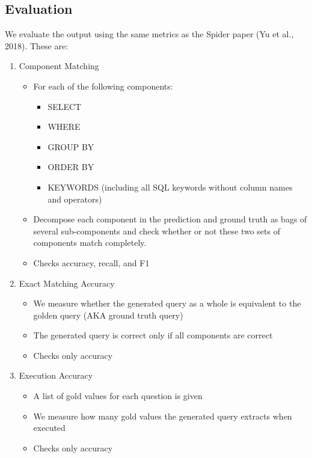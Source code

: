 \subsection{Evaluation}
\label{sec:evaluation-metrics}

We evaluate the output using the same metrics as the Spider paper (Yu et al., 2018). These are:

\begin{enumerate}
\item Component Matching
    \begin{itemize}
        \item For each of the following components:
        \begin{itemize}
            \item SELECT
            \item WHERE
            \item GROUP BY
            \item ORDER BY
            \item KEYWORDS (including all SQL keywords without column names and operators)
        \end{itemize}
        \item Decompose each component in the prediction and ground truth as bags of several sub-components and check whether or not these two sets of components match completely.
        \item Checks accuracy, recall, and F1
    \end{itemize}
\item Exact Matching Accuracy
    \begin{itemize}
        \item We measure whether the generated query as a whole is equivalent to the golden query (AKA ground truth query)
        \item The generated query is correct only if all components are correct
        \item Checks only accuracy
    \end{itemize}
\item Execution Accuracy
    \begin{itemize}
        \item A list of gold values for each question is given
        \item We measure how many gold values the generated query extracts when executed
        \item Checks only accuracy
    \end{itemize}
\end{enumerate}

